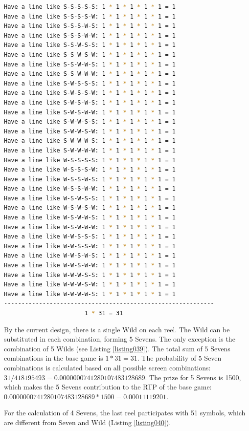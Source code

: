 \documentclass[12pt,twoside,openany]{book}
\begin{document}
\begin{lstlisting}[language=bash, caption={All possible combinations of 5 Sevens}, label=listing039]
Have a line like S-S-S-S-S:	1 * 1 * 1 * 1 * 1 = 1
Have a line like S-S-S-S-W:	1 * 1 * 1 * 1 * 1 = 1
Have a line like S-S-S-W-S:	1 * 1 * 1 * 1 * 1 = 1
Have a line like S-S-S-W-W:	1 * 1 * 1 * 1 * 1 = 1
Have a line like S-S-W-S-S:	1 * 1 * 1 * 1 * 1 = 1
Have a line like S-S-W-S-W:	1 * 1 * 1 * 1 * 1 = 1
Have a line like S-S-W-W-S:	1 * 1 * 1 * 1 * 1 = 1
Have a line like S-S-W-W-W:	1 * 1 * 1 * 1 * 1 = 1
Have a line like S-W-S-S-S:	1 * 1 * 1 * 1 * 1 = 1
Have a line like S-W-S-S-W:	1 * 1 * 1 * 1 * 1 = 1
Have a line like S-W-S-W-S:	1 * 1 * 1 * 1 * 1 = 1
Have a line like S-W-S-W-W:	1 * 1 * 1 * 1 * 1 = 1
Have a line like S-W-W-S-S:	1 * 1 * 1 * 1 * 1 = 1
Have a line like S-W-W-S-W:	1 * 1 * 1 * 1 * 1 = 1
Have a line like S-W-W-W-S:	1 * 1 * 1 * 1 * 1 = 1
Have a line like S-W-W-W-W:	1 * 1 * 1 * 1 * 1 = 1
Have a line like W-S-S-S-S:	1 * 1 * 1 * 1 * 1 = 1
Have a line like W-S-S-S-W:	1 * 1 * 1 * 1 * 1 = 1
Have a line like W-S-S-W-S:	1 * 1 * 1 * 1 * 1 = 1
Have a line like W-S-S-W-W:	1 * 1 * 1 * 1 * 1 = 1
Have a line like W-S-W-S-S:	1 * 1 * 1 * 1 * 1 = 1
Have a line like W-S-W-S-W:	1 * 1 * 1 * 1 * 1 = 1
Have a line like W-S-W-W-S:	1 * 1 * 1 * 1 * 1 = 1
Have a line like W-S-W-W-W:	1 * 1 * 1 * 1 * 1 = 1
Have a line like W-W-S-S-S:	1 * 1 * 1 * 1 * 1 = 1
Have a line like W-W-S-S-W:	1 * 1 * 1 * 1 * 1 = 1
Have a line like W-W-S-W-S:	1 * 1 * 1 * 1 * 1 = 1
Have a line like W-W-S-W-W:	1 * 1 * 1 * 1 * 1 = 1
Have a line like W-W-W-S-S:	1 * 1 * 1 * 1 * 1 = 1
Have a line like W-W-W-S-W:	1 * 1 * 1 * 1 * 1 = 1
Have a line like W-W-W-W-S:	1 * 1 * 1 * 1 * 1 = 1
------------------------------------------------------------	
					   1 * 31 = 31
\end{lstlisting}

By the current design, there is a single Wild on each reel. The Wild can be substituted in each combination, forming 5 Sevens. The only exception is the combination of 5 Wilds (see Listing \ref{listing039}). The total sum of 5 Sevens combinations in the base game is $1 * 31 = 31$. The probability of 5 Seven combinations is calculated based on all possible screen combinations: $31 / 418195493 = 0.0000000741280107483128689$. The prize for 5 Sevens is 1500, which makes the 5 Sevens contribution to the RTP of the base game: $0.0000000741280107483128689 * 1500 = 0.00011119201$.

For the calculation of 4 Sevens, the last reel participates with 51 symbols, which are different from Seven and Wild (Listing \ref{listing040}).
\end{document}
